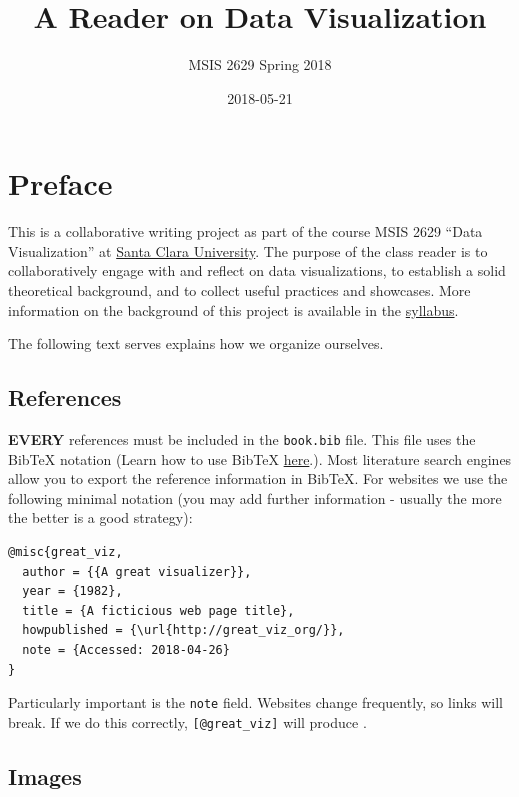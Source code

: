 \documentclass[]{book}
\title{A Reader on Data Visualization}
\author{MSIS 2629 Spring 2018}
\date{2018-05-21}
\theoremstyle{definition}
\theoremstyle{definition}
\theoremstyle{definition}
\theoremstyle{remark}
\begin{document}
\maketitle

{
\setcounter{tocdepth}{1}
\tableofcontents
}
\chapter{Preface}\label{preface}

This is a collaborative writing project as part of the course MSIS 2629
``Data Visualization'' at \href{http://www.scu.edu}{Santa Clara
University}. The purpose of the class reader is to collaboratively
engage with and reflect on data visualizations, to establish a solid
theoretical background, and to collect useful practices and showcases.
More information on the background of this project is available in the
\href{https://mschermann.github.io/msis2629spring2018}{syllabus}.

The following text serves explains how we organize ourselves.

\section{References}\label{references}

\textbf{EVERY} references must be included in the \texttt{book.bib}
file. This file uses the BibTeX notation (Learn how to use BibTeX
\href{http://www.bibtex.org/Using/}{here}.). Most literature search
engines allow you to export the reference information in BibTeX. For
websites we use the following minimal notation (you may add further
information - usually the more the better is a good strategy):

\begin{verbatim}
@misc{great_viz,
  author = {{A great visualizer}},
  year = {1982},
  title = {A ficticious web page title},
  howpublished = {\url{http://great_viz_org/}},
  note = {Accessed: 2018-04-26}
}
\end{verbatim}

Particularly important is the \texttt{note} field. Websites change
frequently, so links will break. If we do this correctly,
\texttt{{[}@great\_viz{]}} will produce \citep{great_viz}.

\section{Images}\label{images}
\end{document}

